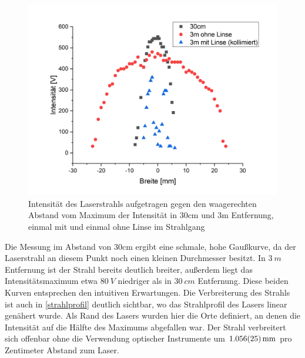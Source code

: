 \documentclass[
	a4paper,
	12pt,
	pagesize,
	ngerman
]{scrartcl}
\begin{document}
\begin{figure}[h!]
	\centering
	\includegraphics[scale=0.5]{breite.png}
	\caption{Intensität des Laserstrahls aufgetragen gegen den waagerechten Abstand vom Maximum der Intensität in 30cm und 3m Entfernung, einmal mit und einmal ohne Linse im Strahlgang}
	\label{breite}
\end{figure}

Die Messung im Abstand von 30cm ergibt eine schmale, hohe Gaußkurve, da der Laserstrahl an diesem Punkt noch einen kleinen Durchmesser besitzt. In $\SI{3}{m}$ Entfernung ist der Strahl bereits deutlich breiter, außerdem liegt das Intensitätsmaximum etwa $\SI{80}{V}$ niedriger als in $\SI{30}{cm}$ Entfernung. Diese beiden Kurven entsprechen den intuitiven Erwartungen. Die Verbreiterung des Strahls ist auch in \cref{strahlprofil} deutlich sichtbar, wo das Strahlprofil des Lasers linear genähert wurde. Als Rand des Lasers wurden hier die Orte definiert, an denen die Intensität auf die Hälfte des Maximums abgefallen war. Der Strahl verbreitert sich offenbar ohne die Verwendung optischer Instrumente um $\SI{1,056\pm0,025}{mm}$ pro Zentimeter Abstand zum Laser.
\end{document}
